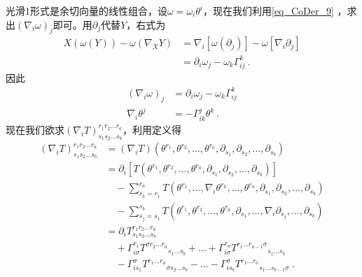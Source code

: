 光滑1形式是余切向量的线性组合，设$\omega=\omega_i\theta^i$，现在我们利用\autoref{eq_CoDer_9} ，求出$(\nabla_i\omega)_j$即可。用$\partial_j$代替$Y$，右式为
\begin{equation}
\begin{aligned}
X(\omega(Y))-\omega\left(\nabla_X Y\right)&=\nabla_i[\omega(\partial_j)]-\omega[\nabla_i\partial_j]\\
&=\partial_i\omega_j-\omega_k\Gamma^k_{ij}~.
\end{aligned}
\end{equation}
因此
\begin{equation}
\begin{aligned}
(\nabla_i\omega)_j&=\partial_i\omega_j-\omega_k\Gamma^k_{ij}\\
\nabla_i\theta^j&=-\Gamma^j_{ik}\theta^k~.
\end{aligned}
\end{equation}
现在我们欲求$(\nabla_iT)^{r_1r_2...r_a}_{s_1s_2...s_b}$，利用定义得
\begin{equation}
\begin{aligned}
(\nabla_i T)^{r_1 r_2 \ldots r_a}_{s_1 s_2 \ldots s_b} &= (\nabla_i T)(\theta^{r_1}, \theta^{r_2}, \ldots, \theta^{r_a}, \partial_{s_1}, \partial_{s_2}, \ldots, \partial_{s_b}) \\
&= \partial_i [T(\theta^{r_1}, \theta^{r_2}, \ldots, \theta^{r_a}, \partial_{s_1}, \partial_{s_2}, \ldots, \partial_{s_b}) ] \\
&\quad - \sum_{r_k=r_1}^{r_a} T(\theta^{r_1}, \ldots, \nabla_i \theta^{r_k}, \ldots, \theta^{r_a}, \partial_{s_1}, \partial_{s_2}, \ldots, \partial_{s_b}) \\
&\quad - \sum_{s_j=s_1}^{s_b} T(\theta^{r_1}, \theta^{r_2}, \ldots, \theta^{r_a}, \partial_{s_1}, \ldots, \nabla_i \partial_{s_j}, \ldots, \partial_{s_b})\\
&=\partial_iT^{r_1 r_2 \ldots r_a}_{s_1 s_2 \ldots s_b}\\
&\quad+\Gamma_{i \sigma}^{r_1} T^{\sigma r_2 \ldots r_a}{ }_{s_1 \ldots s_b}+\ldots+\Gamma_{i \sigma}^{r_a} T^{r_1 \ldots r_{a-1} \sigma}{ }_{s_1 \ldots s_b}\\
&\quad-\Gamma^\sigma _{i s_1} T^{r_1 \ldots r_a}{ }_{\sigma s_2 \ldots s_b}-\ldots-\Gamma_{i s_b}^\sigma T^{r_1 \ldots r_a}{ }_{s_1 \ldots s_{b-1} \sigma}~.
\end{aligned}
\end{equation}









